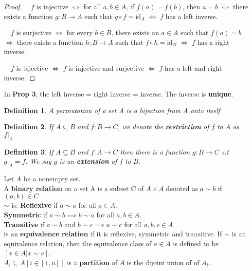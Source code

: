 \documentclass[12pt]{article}
\let\to=\rightarrow
\newtheorem{definition}{Definition}
\begin{document}
\begin{proof}
\item[1] $\quad f$ is injective $\iff$ for all $a, b \in A$, if $f(a) = f(b)$, then $a = b$ $\iff$ there exists a function $g: B \to A$ such that $g \circ f = \text{id}_A$ $\iff$ $f$ has a left inverse.
\item[2] $\quad f$ is surjective $\iff$ for every $b \in B$, there exists an $a \in A$ such that $f(a) = b$ $\iff$ there exists a function $h: B \to A$ such that $f \circ h = \text{id}_B$ $\iff$ $f$ has a right inverse.
\item[3] $\quad f$ is bijective $\iff$ $f$ is injective and surjective $\iff$ $f$ has a left and right inverse.

\end{proof}

In \textbf{Prop 3}, the left inverse = right inverse = inverse. The inverse is \textbf{unique}.

\begin{definition}
A permutation of a set A is a bijection from A onto itself
\end{definition}

\begin{definition}
If $A \subseteq B$ and $f: B \to C$, we denote the \textbf{restriction} of $f$ to A as $f|_{A}$ 
\end{definition}

\begin{definition}
If $A \subseteq B$ and $f: A \to C$ then there is a function $g: B \to C$ s.t  $g|_{A} = f$. We say $g$ is an \textbf{extension} of $f$ to $B$. 
\end{definition}

Let $A$ be a nonempty set.\\
A \textbf{binary relation} on a set A is a subset C of $A \times A$ denoted as $a \sim b$ if $(a,b) \in C$\\
$\sim$ is: \newline
\textbf{Reflexive} if $a \sim a$ for all $a \in A$. \\
\textbf{Symmetric} if $a \sim b \implies b \sim a$ for all $a,b \in A$.\\
\textbf{Transitive} if $a \sim b$ and $b \sim c \implies a \sim c$ for all $a,b,c \in A$.\\
is an \textbf{equivalence relation} if it is reflexive, symmetric and transitive. If $\sim$ is an equivalence relation, then the equivalence class of $a \in A$ is defined to be $[x \in A | x \sim a]$. \\
$A_i \subseteq A [i \in [1,n]]$ is a \textbf{partition} of $A$ is the dijoint union of of $A_i$.
\end{document}
